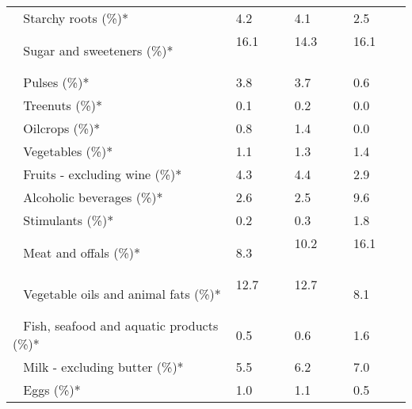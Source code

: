 \begin{tabular}{L{3.9cm} R{1cm} R{1cm} R{1cm}}
	 ~ Starchy roots (\%)* & 4.2 ~ \ \ & 4.1 ~ \ \ & 2.5 ~ \ \ \\ 
	 ~ Sugar and sweeteners (\%)* & 16.1 ~ \ \ & 14.3 ~ \ \ & 16.1 ~ \ \ \\ 
	 ~ Pulses (\%)* & 3.8 ~ \ \ & 3.7 ~ \ \ & 0.6 ~ \ \ \\ 
	 ~ Treenuts (\%)* & 0.1 ~ \ \ & 0.2 ~ \ \ & 0.0 ~ \ \ \\ 
	 ~ Oilcrops (\%)* & 0.8 ~ \ \ & 1.4 ~ \ \ & 0.0 ~ \ \ \\ 
	 ~ Vegetables (\%)* & 1.1 ~ \ \ & 1.3 ~ \ \ & 1.4 ~ \ \ \\ 
	 ~ Fruits - excluding wine (\%)* & 4.3 ~ \ \ & 4.4 ~ \ \ & 2.9 ~ \ \ \\ 
	 ~ Alcoholic beverages (\%)* & 2.6 ~ \ \ & 2.5 ~ \ \ & 9.6 ~ \ \ \\ 
	 ~ Stimulants (\%)* & 0.2 ~ \ \ & 0.3 ~ \ \ & 1.8 ~ \ \ \\ 
	 ~ Meat and offals (\%)* & 8.3 ~ \ \ & 10.2 ~ \ \ & 16.1 ~ \ \ \\ 
	 ~ Vegetable oils and animal fats (\%)* & 12.7 ~ \ \ & 12.7 ~ \ \ & 8.1 ~ \ \ \\ 
	 ~ Fish, seafood and aquatic products (\%)* & 0.5 ~ \ \ & 0.6 ~ \ \ & 1.6 ~ \ \ \\ 
	 ~ Milk - excluding butter (\%)* & 5.5 ~ \ \ & 6.2 ~ \ \ & 7.0 ~ \ \ \\ 
	 ~ Eggs (\%)* & 1.0 ~ \ \ & 1.1 ~ \ \ & 0.5 ~ \ \ \\ 
       \toprule
      \end{tabular}
      \clearpage
{}
